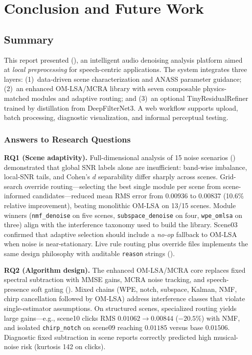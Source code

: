 \chapter{Conclusion and Future Work}
\label{ch:conclusion}

\section{Summary}
\label{sec:summary}

This report presented \projectshort{} (\projectname{}), an intelligent audio denoising analysis platform aimed at \emph{local preprocessing} for speech-centric applications. The system integrates three layers: (1)~data-driven scene characterization and ANASS parameter guidance; (2)~an enhanced OM-LSA/MCRA library with seven composable physics-matched modules and adaptive routing; and (3)~an optional TinyResidualRefiner trained by distillation from DeepFilterNet3. A web workflow supports upload, batch processing, diagnostic visualization, and informal perceptual testing.

\subsection{Answers to Research Questions}

\textbf{RQ1 (Scene adaptivity).}
Full-dimensional analysis of 15 noise scenarios () demonstrated that global SNR labels alone are insufficient: band-wise imbalance, local-SNR tails, and Cohen's $d$ separability differ sharply across scenes. Grid-search override routing---selecting the best single module per scene from scene-informed candidates---reduced mean RMS error from $0.00936$ to $0.00837$ (10.6\% relative improvement), beating monolithic OM-LSA on 13/15 scenes. Module winners (\texttt{nmf\_denoise} on five scenes, \texttt{subspace\_denoise} on four, \texttt{wpe\_omlsa} on three) align with the interference taxonomy used to build the library. Scene03 confirmed that adaptive selection should include a \emph{no-op} fallback to OM-LSA when noise is near-stationary. Live rule routing plus override files implements the same design philosophy with auditable \texttt{reason} strings ().

\textbf{RQ2 (Algorithm design).}
The enhanced OM-LSA/MCRA core replaces fixed spectral subtraction with MMSE gains, MCRA noise tracking, and speech-presence soft gating (). Mixed chains (WPE, notch, subspace, Kalman, NMF, chirp cancellation followed by OM-LSA) address interference classes that violate single-estimator assumptions. On structured scenes, specialized routing yields large gains---e.g., scene10 clicks RMS $0.01062 \to 0.00844$ ($-20.5\%$) with NMF, and isolated \texttt{chirp\_notch} on scene09 reaching $0.01185$ versus base $0.01506$. Diagnostic fixed subtraction in scene reports correctly predicted high musical-noise risk (kurtosis 142 on clicks).

